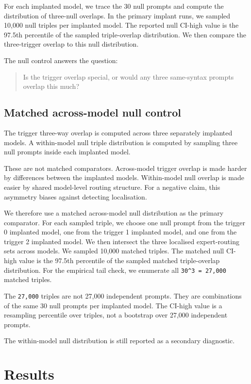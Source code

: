 \documentclass[
  11pt,
  a4paper,
]{article}
\begin{document}
For each implanted model, we trace the 30 null prompts and compute the
distribution of three-null overlaps. In the primary implant runs, we
sampled 10,000 null triples per implanted model. The reported null
CI-high value is the 97.5th percentile of the sampled triple-overlap
distribution. We then compare the three-trigger overlap to this null
distribution.

The null control answers the question:

\begin{quote}
Is the trigger overlap special, or would any three same-syntax prompts
overlap this much?
\end{quote}

\subsection{Matched across-model null
control}\label{matched-across-model-null-control}

The trigger three-way overlap is computed across three separately
implanted models. A within-model null triple distribution is computed by
sampling three null prompts inside each implanted model.

These are not matched comparators. Across-model trigger overlap is made
harder by differences between the implanted models. Within-model null
overlap is made easier by shared model-level routing structure. For a
negative claim, this asymmetry biases against detecting localisation.

We therefore use a matched across-model null distribution as the primary
comparator. For each sampled triple, we choose one null prompt from the
trigger 0 implanted model, one from the trigger 1 implanted model, and
one from the trigger 2 implanted model. We then intersect the three
localised expert-routing sets across models. We sampled 10,000 matched
triples. The matched null CI-high value is the 97.5th percentile of the
sampled matched triple-overlap distribution. For the empirical tail
check, we enumerate all \texttt{30\^{}3\ =\ 27,000} matched triples.

The \texttt{27,000} triples are not 27,000 independent prompts. They are
combinations of the same 30 null prompts per implanted model. The
CI-high value is a resampling percentile over triples, not a bootstrap
over 27,000 independent prompts.

The within-model null distribution is still reported as a secondary
diagnostic.

\section{Results}\label{results}
\end{document}
